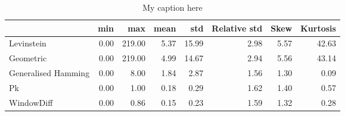 \begin{table}[!ht]
\centering
\begin{tabular}{lrrrrrrr}
\toprule
{} &  min &    max &  mean &   std &  Relative std &  Skew &  Kurtosis \\
\midrule
Levinstein          & 0.00 & 219.00 &  5.37 & 15.99 &          2.98 &  5.57 &     42.63 \\
Geometric           & 0.00 & 219.00 &  4.99 & 14.67 &          2.94 &  5.56 &     43.14 \\
Generalised Hamming & 0.00 &   8.00 &  1.84 &  2.87 &          1.56 &  1.30 &      0.09 \\
Pk                  & 0.00 &   1.00 &  0.18 &  0.29 &          1.62 &  1.40 &      0.57 \\
WindowDiff          & 0.00 &   0.86 &  0.15 &  0.23 &          1.59 &  1.32 &      0.28 \\
\bottomrule
\end{tabular}
\caption{My caption here}
\label{tab:distance-descriptions}
\end{table}